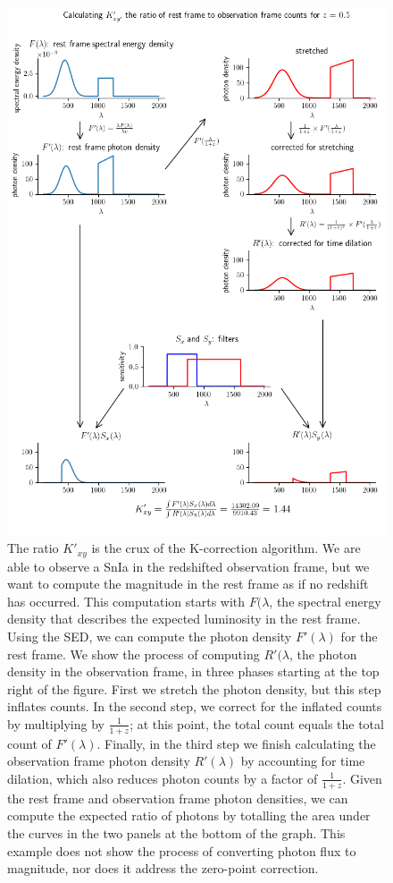 \documentclass[linenumbers]{aastex631}
\begin{document}
\begin{figure}
  \includegraphics[width=.75\linewidth, height=0.75\vsize]{k_equation_flow.png}
  \caption{The ratio $K'_{xy}$ is the crux of the K-correction algorithm. We
  are able to observe a SnIa in the redshifted observation frame, but we want
  to compute the magnitude in the rest frame as if no redshift has occurred.
  This computation starts with $F(\lambda$, the spectral energy density that
  describes the expected luminosity in the rest frame. Using the SED, we can
  compute the photon density $F'(\lambda)$ for the rest frame. We show the
  process of computing $R'(\lambda$, the photon density in the observation
  frame, in three phases starting at the top right of the figure. First we
  stretch the photon density, but this step inflates counts. In the second
  step, we correct for the inflated counts by multiplying by $\frac{1}{1+z}$;
  at this point, the total count equals the total count of $F'(\lambda)$.
  Finally, in the third step we finish calculating the observation frame photon
  density $R'(\lambda)$ by accounting for time dilation, which also reduces
  photon counts by a factor of $\frac{1}{1+z}$.  Given the rest frame and
  observation frame photon densities, we can compute the expected ratio of
  photons by totalling the area under the curves in the two panels at the
  bottom of the graph. This example does not show the process of converting
  photon flux to magnitude, nor does it address the zero-point correction.
  }
  \label{fig:k-example}
\end{figure}
\end{document}
